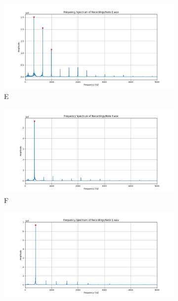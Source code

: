 \documentclass{article}
\begin{document}
\begin{itemize}
\begin{figure}[H]
    \begin{subfigure}{0.49\textwidth}
        \includegraphics[width=\textwidth]{E Note.png}
        \caption{E}
        \label{fig:E4_Note}
    \end{subfigure}
        \label{fig:B4_Note}
        \begin{subfigure}{0.49\textwidth}
        \includegraphics[width=\textwidth]{F Note.png}
        \caption{F}
        \label{fig:F4_Note}
    \end{subfigure}
     \centering
    \begin{subfigure}{0.49\textwidth}
        \includegraphics[width=\textwidth]{G Note.png}

\end{subfigure}
\end{figure}
\end{itemize}
\end{document}
